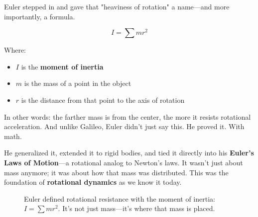 Euler stepped in and gave that "heaviness of rotation" a name—and more importantly, a formula.

\[
I = \sum m r^2
\]

Where:
\begin{itemize}
    \item \( I \) is the \textbf{moment of inertia}
    \item \( m \) is the mass of a point in the object
    \item \( r \) is the distance from that point to the axis of rotation
\end{itemize}

In other words: the farther mass is from the center, the more it resists rotational acceleration. And unlike Galileo, Euler didn’t just say this. He proved it. With math. 

He generalized it, extended it to rigid bodies, and tied it directly into his \textbf{Euler’s Laws of Motion}—a rotational analog to Newton’s laws. It wasn’t just about mass anymore; it was about how that mass was distributed. This was the foundation of \textbf{rotational dynamics} as we know it today.


\begin{figure}[H]
\centering
{}
\caption{Euler defined rotational resistance with the moment of inertia: $I = \sum m r^2$. It’s not just mass—it’s where that mass is placed.}
\end{figure}



